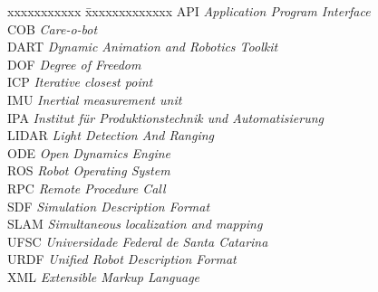 \ifx\isenglish\undefined
{}
\else
{}
\fi


\begin{tabbing}
xxxxxxxxxxx \= xxxxxxxxxxxxx \kill
\textsc{API} \> \textit{Application Program Interface} \\
\textsc{COB}            \> \textit{Care-o-bot}\\
\textsc{DART} \> \textit{Dynamic Animation and Robotics Toolkit} \\
\textsc{DOF} \> \textit{Degree of Freedom} \\
\textsc{ICP} \> \textit{Iterative closest point} \\
\textsc{IMU} \> \textit{Inertial measurement unit} \\
\textsc{IPA} \> \textit{Institut f{\"u}r Produktionstechnik und Automatisierung} \\
\textsc{LIDAR}            \> \textit{Light Detection And Ranging}\\
\textsc{ODE} \> \textit{Open Dynamics Engine} \\
\textsc{ROS}            \> \textit{Robot Operating System}\\
\textsc{RPC}            \> \textit{Remote Procedure Call}\\
\textsc{SDF}            \> \textit{Simulation Description Format}\\
\textsc{SLAM}            \> \textit{Simultaneous localization and mapping}\\
\textsc{UFSC} \> \textit{Universidade Federal de Santa Catarina}\\
\textsc{URDF}            \> \textit{Unified Robot Description Format}\\
\textsc{XML}            \> \textit{Extensible Markup Language}\\
\end{tabbing}

